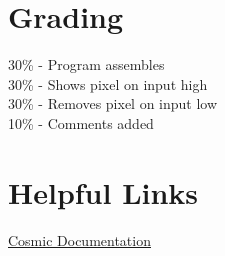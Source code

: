 \documentclass[
	12pt, %
]{fphw}
\begin{document}

\section*{Grading}

30\% - Program assembles\\
30\% - Shows pixel on input high\\
30\% - Removes pixel on input low\\
10\% - Comments added\\




\section*{Helpful Links}
\href{https://github.com/clbx/Cosmic/tree/master/doc}{Cosmic Documentation}\\

\end{document}
